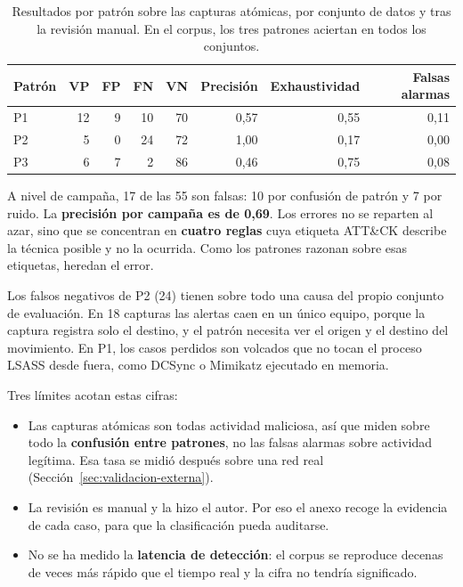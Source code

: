 \begin{table}[H]
\centering
\small
\begin{tabular}{|l|r|r|r|r|r|r|r|}
\hline
\textbf{Patrón} & \textbf{VP} & \textbf{FP} & \textbf{FN} & \textbf{VN} &
\textbf{Precisión} & \textbf{Exhaustividad} & \textbf{Falsas alarmas} \\
\hline
P1 & 12 & 9 & 10 & 70 & 0,57 & 0,55 & 0,11 \\
P2 & 5 & 0 & 24 & 72 & 1,00 & 0,17 & 0,00 \\
P3 & 6 & 7 & 2 & 86 & 0,46 & 0,75 & 0,08 \\
\hline
\end{tabular}
\caption{Resultados por patrón sobre las capturas atómicas, por conjunto de datos y tras la
revisión manual. En el corpus, los tres patrones aciertan en todos los conjuntos.}
\label{tab:fp-pilarA}
\end{table}

A nivel de campaña, 17 de las 55 son falsas: 10 por confusión de patrón y 7 por ruido. La
\textbf{precisión por campaña es de 0,69}. Los errores no se reparten al azar, sino que se
concentran en \textbf{cuatro reglas} cuya etiqueta ATT\&CK describe la técnica posible y no
la ocurrida. Como los patrones razonan sobre esas etiquetas, heredan el error.

Los falsos negativos de P2 (24) tienen sobre todo una causa del propio conjunto de
evaluación. En 18 capturas las alertas caen en un único equipo, porque la captura registra
solo el destino, y el patrón necesita ver el origen y el destino del movimiento. En P1, los
casos perdidos son volcados que no tocan el proceso LSASS desde fuera, como DCSync o
Mimikatz ejecutado en memoria.

Tres límites acotan estas cifras:
\begin{itemize}
    \item Las capturas atómicas son todas actividad maliciosa, así que miden sobre todo la
    \textbf{confusión entre patrones}, no las falsas alarmas sobre actividad legítima. Esa
    tasa se midió después sobre una red real (Sección~\ref{sec:validacion-externa}).
    \item La revisión es manual y la hizo el autor. Por eso el anexo recoge la evidencia de
    cada caso, para que la clasificación pueda auditarse.
    \item No se ha medido la \textbf{latencia de detección}: el corpus se reproduce decenas
    de veces más rápido que el tiempo real y la cifra no tendría significado.
\end{itemize}

